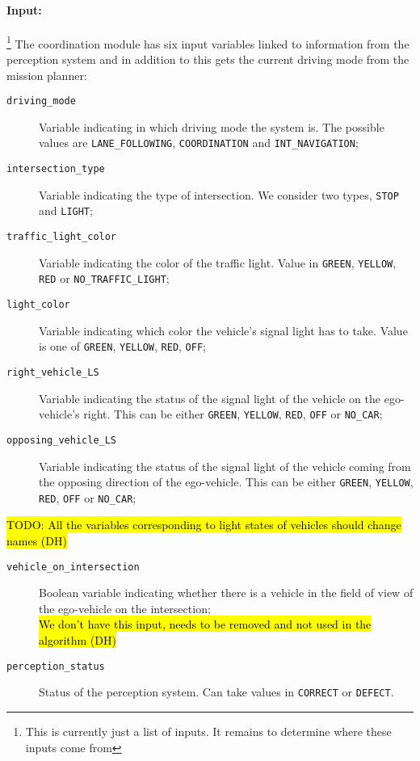 \documentclass[11pt]{article}
\theoremstyle{definition}
\begin{document}
\paragraph{Input:}\footnote{This is currently just a list of inputs. It remains to determine where these inputs come from} The coordination module has six input variables linked to information from the perception system and in addition to this gets the current driving mode from the mission planner:
\begin{description}
\item[\texttt{driving\_mode}] Variable indicating in which driving mode the system is. The possible values are \texttt{LANE\_FOLLOWING}, \texttt{COORDINATION} and \texttt{INT\_NAVIGATION};
\item[\texttt{intersection\_type}] Variable indicating the type of intersection. We consider two types, \texttt{STOP} and \texttt{LIGHT};
\item[\texttt{traffic\_light\_color}] Variable indicating the color of the traffic light. Value in \texttt{GREEN}, \texttt{YELLOW}, \texttt{RED} or \texttt{NO\_TRAFFIC\_LIGHT};
\item [\texttt{light\_color}] Variable indicating which color the vehicle's signal light has to take. Value is one of \texttt{GREEN}, \texttt{YELLOW}, \texttt{RED}, \texttt{OFF}; 
\item[\texttt{right\_vehicle\_LS}] Variable indicating the status of the signal light of the vehicle on the ego-vehicle's right. This can be either \texttt{GREEN}, \texttt{YELLOW}, \texttt{RED}, \texttt{OFF} or \texttt{NO\_CAR};
\item[\texttt{opposing\_vehicle\_LS}] Variable indicating the status of the signal light of the vehicle coming from the opposing direction of the ego-vehicle. This can be either \texttt{GREEN}, \texttt{YELLOW}, \texttt{RED}, \texttt{OFF} or \texttt{NO\_CAR};
\end{description}
\hl{TODO: All the variables corresponding to light states of vehicles should change names (DH)}
\begin{description}
\item[\texttt{vehicle\_on\_intersection}] Boolean variable indicating whether there is a vehicle in the field of view of the ego-vehicle on the intersection;\\ \hl{We don't have this input, needs to be removed and not used in the algorithm (DH)}
\item[\texttt{perception\_status}] Status of the perception system. Can take values in \texttt{CORRECT} or \texttt{DEFECT}.
\end{description}
\end{document}
